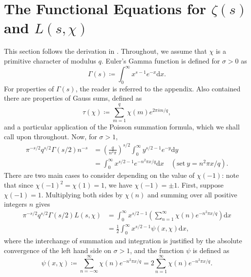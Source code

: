 \section{The Functional Equations for \texorpdfstring{$\zeta(s)$}{Lg} and \texorpdfstring{$L(s, \chi)$}{Lg}}
This section follows the derivation in \cite[Chapter~9]{davenport}. Throughout, we assume that $\chi$ is a primitive character of modulus $q$. Euler's Gamma function is defined for $\sigma > 0$ as 
\begin{equation}
    \Gamma(s) \coloneqq \int_{0}^{\infty}x^{s - 1} e^{-x} \mathrm{d} x. \nonumber
\end{equation}
For properties of $\Gamma(s)$, the reader is referred to the appendix. Also contained there are properties of Gauss sums, defined as 
\begin{equation}
    \tau(\chi) \coloneqq \sum_{m=1}^{q} \chi(m) e^{2\pi i m/q}, \nonumber
\end{equation}
and a particular application of the Poisson summation formula, which we shall call upon throughout. Now, for $\sigma > 1$,
\begin{align}
    \label{FirstIdentity}
    \pi^{-s/2} q^{s/2} \Gamma(s/2) n^{-s} &= \left(\frac{q}{n^2 \pi}\right)^{s/2} \int_{0}^{\infty} y^{s/2 - 1} e^{-y} \mathrm{d} y \nonumber \\
    &= \int_{0}^{\infty} x^{s/2 - 1} e^{-n^{2} \pi x / q} \mathrm{d} x \quad (\textrm{set} \ y = n^{2}\pi x /q).
\end{align}
There are two main cases to consider depending on the value of $\chi(-1)$: note that since $\chi(-1)^{2} = \chi(1) = 1$, we have $\chi(-1) = \pm 1$. First, suppose $\chi(-1) = 1$. Multiplying both sides by $\chi(n)$ and summing over all positive integers $n$ gives
\begin{align}
    \pi^{-s/2} q^{s/2} \Gamma(s/2) L(s, \chi) &= \int_{0}^{\infty} x^{s/2 - 1} \left(\sum_{n=1}^{\infty}\chi(n) e^{-n^{2} \pi x / q} \right) \mathrm{d} x \nonumber \\
    &= \frac12 \int_{0}^{\infty} x^{s/2 - 1} \psi(x, \chi) \mathrm{d} x, \nonumber
\end{align}
where the interchange of summation and integration is justified by the absolute convergence of the left hand side on $\sigma > 1$, and the function $\psi$ is defined as
\begin{equation}
    \psi(x, \chi) \coloneqq \sum_{n=-\infty}^{\infty}\chi(n) e^{-n^{2}\pi x/q} = 2\sum_{n=1}^{\infty}\chi(n) e^{-n^{2}\pi x/q}. \nonumber
\end{equation}
